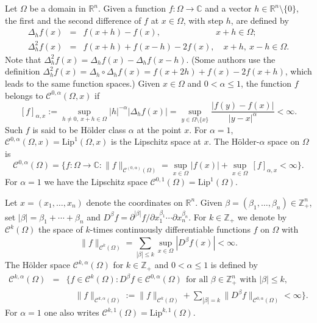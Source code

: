 \documentclass[11pt]{amsart}
\numberwithin{equation}{section}
\theoremstyle{definition}
\newcommand\Cscr{\mathscr{C}}
\newcommand\C{\mathbb{C}}
\newcommand\R{\mathbb{R}}
\newcommand\Z{\mathbb{Z}}
\newcommand\di{\partial}
\newcommand\Lip{\mathrm{Lip}}
\begin{document}
Let $\Omega$ be a domain in $\R^n$. 
Given a function $f:\Omega\to\C$ and a vector 
$h\in \R^n\setminus\{0\}$, the first and the second difference of $f$ 
at $x\in \Omega$, with step $h$, are defined by 
\begin{eqnarray}\label{eq:Delta}
	\Delta_h f(x) &=& f(x+h)-f(x), 
	\quad \ \ \quad\qquad\qquad x+h\in \Omega; \\
	\label{eq:Delta2}
	\Delta^2_h f(x) &=& f(x+h)+f(x-h)-2f(x),\quad x+h,\ x-h\in \Omega.
\end{eqnarray}
Note that $\Delta^2_h f(x) =\Delta_h f(x) - \Delta_h f(x-h)$.
(Some authors use the definition 
$\Delta^2_h f(x)=\Delta_h \circ\Delta_h f(x) = f(x+2h)+f(x)-2f(x+h)$, 
which leads to the same function spaces.)
Given $x\in\Omega$ and $0<\alpha\le 1$, the function $f$ 
belongs to $\Cscr^{0,\alpha}(\Omega,x)$ if 
\[
	[f]_{\alpha,x} := 
	\sup_{h\ne 0,\ x+h\in \Omega} |h|^{-\alpha}|\Delta_h f(x)|
	= \sup_{y\in\Omega\setminus\{x\}} \frac{|f(y)-f(x)|}{|y-x|^\alpha}  
	< \infty.
\]
Such $f$ is said to be H\"older class $\alpha$ at the point $x$. 
For $\alpha=1$, $\Cscr^{0,\alpha}(\Omega,x)=\Lip^1(\Omega,x)$ is the 
Lipschitz space at $x$. The H\"older-$\alpha$ space on $\Omega$ is
\begin{equation}\label{eq:Calpha}
	\Cscr^{0,\alpha}(\Omega) =
	\bigl\{f:\Omega\to \C: \|f\|_{\Cscr^{(0,\alpha)}(\Omega)} = 
	\sup_{x\in \Omega} |f(x)| + \sup_{x\in \Omega}\, [f]_{\alpha,x}<\infty
	\bigr\}.
\end{equation}
For $\alpha=1$ we have the Lipschitz space
$\Cscr^{0,1}(\Omega)=\mathrm{Lip}^1(\Omega)$. 

Let $x=(x_1,\ldots,x_n)$ denote the coordinates on $\R^n$.
Given $\beta=(\beta_1,\ldots,\beta_n)\in\Z_+^n$, set 
$|\beta|=\beta_1+\cdots+\beta_n$ and  
$D^\beta f=\di^{|\beta|}f/\di x_1^{\beta_1} \cdots \di x_n^{\beta_n}$. 
For $k\in \Z_+$ we denote by $\Cscr^k(\Omega)$ the space
of $k$-times continuously differentiable functions $f$ on $\Omega$ with 
\[
	\|f\|_{\Cscr^k(\Omega)} 
	= \sum_{|\beta|\le k} \sup_{x\in \Omega} |D^\beta f(x)| < \infty.
\]
The H\"older space $\Cscr^{k,\alpha}(\Omega)$ for $k\in \Z_+$ and 
$0<\alpha\le 1$ is defined by 
\begin{eqnarray}\label{eq:Ckalpha}
	\Cscr^{k,\alpha}(\Omega) &=& 
	\Big\{f\in \Cscr^k(\Omega): D^\beta f\in \Cscr^{0,\alpha}(\Omega)
	\ \ \text{for all $\beta\in \Z_+^n$ with $|\beta|\le k$}, \\ 
	&& \quad 
	\label{eq:Ckalpha-norm}
	\|f\|_{\Cscr^{k,\alpha}(\Omega)} 
	:= \|f\|_{\Cscr^{k}(\Omega)} 
	+ \sum_{|\beta|=k} \|D^\beta f\|_{\Cscr^{0,\alpha}(\Omega)} <\infty 
	\Big\}.
\end{eqnarray}
For $\alpha=1$ one also writes 
$\Cscr^{k,1}(\Omega)= \mathrm{Lip}^{k,1}(\Omega)$.
\end{document}
